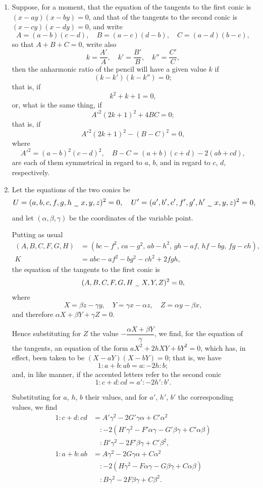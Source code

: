 \documentclass[12pt,a4paper]{article}
\theoremstyle{plain}
\theoremstyle{definition}
\theoremstyle{remark}
\begin{document}
\begin{enumerate}[label=\arabic*.]
\item Suppose, for a moment, that the equation of the tangents to the first conic is $(x - ay)(x - by) = 0$, and that of the tangents to the second conic is $(x - cy)(x - dy) = 0$, and write
\[A = (a-b)(c-d), \quad B = (a-c)(d-b), \quad C = (a-d)(b-c),\]
so that $A + B + C = 0$, write also
\[k = \frac{A'}{A}, \quad k' = \frac{B'}{B}, \quad k'' = \frac{C'}{C},\]
then the anharmonic ratio of the pencil will have a given value $k$ if
\[(k - k')(k - k'') = 0;\]
that is, if
\[k^2 + k + 1 = 0,\]
or, what is the same thing, if
\[A'^2 (2k+1)^2 + 4BC = 0;\]
that is, if
\[A'^2 (2k+1)^2 - (B-C)^2 = 0,\]
where
\[A'^2 = (a-b)^2(c-d)^2, \quad B-C = (a+b)(c+d) - 2(ab+cd),\]
are each of them symmetrical in regard to $a$, $b$, and in regard to $c$, $d$, respectively.

\item Let the equations of the two conics be
\[
\resizebox{\textwidth}{!}{$\displaystyle U = (a,b,c,f,g,h \,\raisebox{-0.5ex}{\,\texttildelow\,}\, x,y,z)^2 = 0, \quad U' = (a',b',c',f',g',h' \,\raisebox{-0.5ex}{\,\texttildelow\,}\, x,y,z)^2 = 0, $}
\]
and let $(\alpha, \beta, \gamma)$ be the coordinates of the variable point.

Putting as usual
\begin{align*}
(A,B,C,F,G,H) &= (bc-f^2,\, ca-g^2,\, ab-h^2,\, gh-af,\, hf-bg,\, fg-ch), \\
K &= abc - af^2 - bg^2 - ch^2 + 2fgh,
\end{align*}
the equation of the tangents to the first conic is
\[(A,B,C,F,G,H \,\raisebox{-0.5ex}{\,\texttildelow\,}\, X,Y,Z)^2 = 0,\]
where
\[X = \beta z - \gamma y, \quad Y = \gamma x - \alpha z, \quad Z = \alpha y - \beta x,\]
and therefore $\alpha X + \beta Y + \gamma Z = 0$.

Hence substituting for $Z$ the value $-\dfrac{\alpha X + \beta Y}{\gamma}$, we find, for the equation of the tangents, an equation of the form $aX^2 + 2hXY + bY^2 = 0$, which has, in effect, been taken to be $(X - aY)(X - bY) = 0$; that is, we have
\[1 : a+b : ab = a : -2h : b;\]
and, in like manner, if the accented letters refer to the second conic
\[1 : c+d : cd = a' : -2h' : b'.\]

Substituting for $a$, $h$, $b$ their values, and for $a'$, $h'$, $b'$ the corresponding values, we find
\begin{align*}
1 : c+d : cd &= A'\gamma^2 - 2G'\gamma\alpha + C'\alpha^2 \\
&\quad : -2(H'\gamma^2 - F'\alpha\gamma - G'\beta\gamma + C'\alpha\beta) \\
&\quad : B'\gamma^2 - 2F'\beta\gamma + C'\beta^2, \\
1 : a+b : ab &= A\gamma^2 - 2G\gamma\alpha + C\alpha^2 \\
&\quad : -2(H\gamma^2 - F\alpha\gamma - G\beta\gamma + C\alpha\beta) \\
&\quad : B\gamma^2 - 2F\beta\gamma + C\beta^2.
\end{align*}


\end{enumerate}
\end{document}
